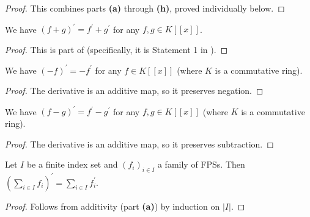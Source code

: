 \begin{proof}
This combines parts \textbf{(a)} through \textbf{(h)}, proved individually below.
\end{proof}

\begin{lemma}
\label{lem.fps.deriv.rules.a}
\leanhelper
\leanok
We have $\left(  f+g\right)  ^{\prime}=f^{\prime}+g^{\prime}$
for any $f,g\in K\left[  \left[  x\right]  \right]$.
\end{lemma}

\begin{proof}
\leanok
This is part of \cite[Exercise 5 \textbf{(b)}]{19s-mt3s} (specifically, it is
Statement 1 in \cite[solution to Exercise 5 \textbf{(b)}]{19s-mt3s}).
\end{proof}

\begin{lemma}
\label{lem.fps.deriv.neg}
\leanhelper
\leanok
We have $(-f)^{\prime} = -f^{\prime}$
for any $f\in K\left[  \left[  x\right]  \right]$ (where $K$ is a commutative ring).
\end{lemma}

\begin{proof}
\leanok
The derivative is an additive map, so it preserves negation.
\end{proof}

\begin{lemma}
\label{lem.fps.deriv.sub}
\leanhelper
\leanok
We have $(f - g)^{\prime} = f^{\prime} - g^{\prime}$
for any $f,g\in K\left[  \left[  x\right]  \right]$ (where $K$ is a commutative ring).
\end{lemma}

\begin{proof}
\leanok
The derivative is an additive map, so it preserves subtraction.
\end{proof}

\begin{lemma}
\label{lem.fps.deriv.rules.b.finite}
\leanhelper
\leanok
Let $I$ be a finite index set and $(f_i)_{i\in I}$ a family of FPSs.
Then
$\left(\sum_{i\in I} f_i\right)^{\prime} = \sum_{i\in I} f_i^{\prime}$.
\end{lemma}

\begin{proof}
\leanok
Follows from additivity (part \textbf{(a)}) by induction on $|I|$.
\end{proof}


